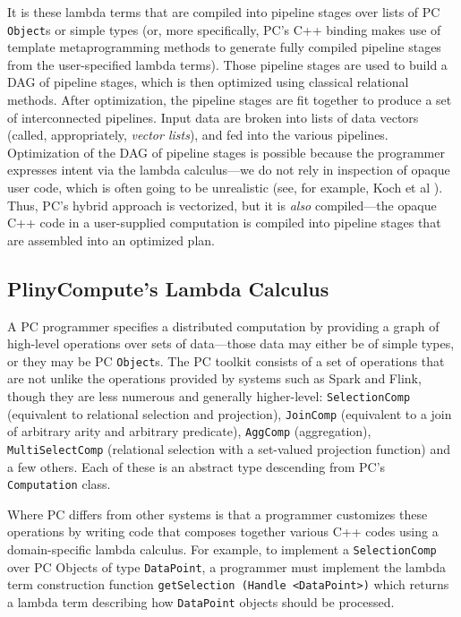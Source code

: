 It is these lambda terms that are compiled into pipeline stages over
lists of PC \texttt{Object}s or simple types (or, more specifically, PC's C++ binding makes use of template metaprogramming
methods to generate fully compiled pipeline stages from the user-specified lambda terms). 
Those pipeline stages are used to build a DAG of pipeline stages, which is then optimized using classical relational
methods. After optimization, the pipeline stages are fit together to produce a set of interconnected pipelines.  Input data are broken into lists of 
data vectors (called, appropriately, \emph{vector lists}), and fed into the various pipelines.
Optimization of the DAG of pipeline stages
is possible because the programmer expresses intent via the lambda calculus---we do not rely in inspection of opaque user
code, which is often going to be unrealistic (see, for example, Koch et al \cite{}).  Thus, PC's hybrid approach is vectorized, 
but it is \emph{also} compiled---the opaque C++ code in a user-supplied computation is compiled into pipeline stages that are assembled into an 
optimized plan.

\subsection{PlinyCompute's Lambda Calculus}
A PC programmer specifies a distributed computation by providing a graph of high-level operations over sets of data---those data
may either be of simple types, or they may be
PC \texttt{Object}s. The PC toolkit consists of a set of
operations 
that are not unlike the operations provided by systems such as Spark and Flink, though they are less numerous and generally higher-level:
\texttt{SelectionComp} (equivalent to relational selection and projection), \texttt{JoinComp} (equivalent to a join of arbitrary arity and arbitrary predicate), 
\texttt{AggComp} (aggregation), \texttt{MultiSelectComp} (relational selection with a set-valued projection function) and a few others.  
Each of these is an abstract type descending from PC's \texttt{Computation} class.

Where PC differs from other systems is that a programmer customizes these operations by writing code that composes together various C++ codes 
using a 
domain-specific lambda calculus.
For example, to implement a \texttt{SelectionComp} over PC Objects of type \texttt{DataPoint}, a programmer
must implement the lambda term construction function \texttt{getSelection (Handle <DataPoint>)} which returns a lambda term
describing how \texttt{DataPoint} objects
should be processed.

